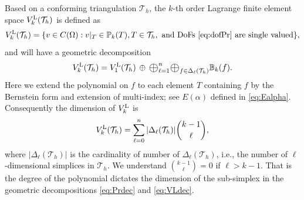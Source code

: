 \documentclass[mathpazo]{cicp}
\newcommand{\Oplus}{\ensuremath{\vcenter{\hbox{\scalebox{1.5}{$\oplus$}}}}}
\begin{document}
Based on a conforming triangulation $\mathcal T_h$, the $k$-th order Lagrange finite element space $V_k^{\rm L}(\mathcal T_h)$ is defined as 
$$
V_k^{\rm L}(\mathcal T_h) = \{ v\in C(\Omega): v|_{T}\in \mathbb P_k(T),  T\in \mathcal T_h, \text{ and DoFs \eqref{eq:dofPr} are single valued}\},
$$
and will have a geometric decomposition
\begin{equation}\label{eq:VLdec}
V_k^{\rm L}(\mathcal T_h) = V_1^{\rm L}(\mathcal T_h) \,\oplus\, \Oplus_{\ell = 1}^n \Oplus_{f\in \Delta_{\ell}(\mathcal T_h)} \mathbb B_k(f).
\end{equation}
Here we extend the polynomial on $f$ to each element $T$ containing $f$ by the Bernstein form and extension of multi-index; see $E(\alpha)$ defined in \eqref{eq:Ealpha}. Consequently the dimension of $V_k^{\rm L}$ is
$$
V_k^{\rm L}(\mathcal T_h) = \sum_{\ell = 0}^n |\Delta_{\ell}(\mathcal T_h)| { k - 1 \choose \ell},
$$
where $|\Delta_{\ell}(\mathcal T_h)|$ is the cardinality of  number of $\Delta_{\ell}(\mathcal T_h)$, i.e., the number of $\ell$-dimensional simplices in $\mathcal T_h$. We understand ${ k - 1 \choose \ell} = 0$ if $\ell > k-1$. That is the degree of the polynomial dictates the dimension of the sub-simplex in the geometric decompositions \eqref{eq:Prdec} and \eqref{eq:VLdec}. 

\end{document}
